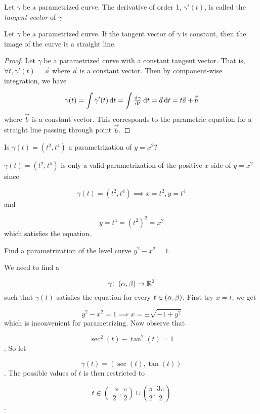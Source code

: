 \begin{definition}
		Let \(\gamma\) be a parametrized curve. The derivative of order 1, \(\gamma'(t)\), is called the \textit{tangent vector} of \(\gamma\)

\end{definition}


\begin{theorem}
		Let \(\gamma\) be a parametrized curve. If the tangent vector of \(\gamma\) is constant, then the image of the curve is a straight line.

\begin{proof}
			Let \(\gamma\) be a parametrized curve with a constant tangent vector. That is, \(\forall t, \gamma'(t) = \vec{a}\) where \(\vec{a}\) is a constant vector. Then by component-wise integration, we have

\[
\gamma(t) = \int\gamma'(t) \dif t = \int\od{\gamma}{t} \dif t = \vec{a} \dif t = t\vec{a} + \vec{b}
\]
			where \(\vec{b}\) is a constant vector. This corresponds to the parametric equation for a straight line passing through point \(\vec{b}\).

\end{proof}

\end{theorem}


\begin{problem}
		Is \(\gamma(t) = (t^{2}, t^{4})\) a parametrization of \(y = x^{2}\)?

\end{problem}


\begin{solution}
		\(\gamma(t) = (t^{2}, t^{4})\) is only a valid parametrization of the positive \(x\) side of \(y = x^{2}\) since

\[
\gamma(t) = (t^{2}, t^{4}) \implies x = t^{2}, y = t^{4}
\]
		and

\[
y = t^{4} = (t^{2})^{2} = x^{2}
\]
		which satisfies the equation.

\end{solution}


\begin{problem}
		Find a parametrization of the level curve \(y^{2} - x^{2} = 1\).

\end{problem}


\begin{solution}
		We need to find a

\[
\gamma \colon \intoo{\alpha,\beta} \rightarrow \mathbb{R}^{2}
\]
		such that \(\gamma(t)\) satisfies the equation for every \(t \in \intoo{\alpha, \beta}\). First try \(x = t\), we get

\[
y^{2} - x^{2} = 1 \implies x = \pm\sqrt{-1 + y^{2}}
\]
		which is inconvenient for parametrizing. Now observe that

\[
\sec^{2}(t) - \tan^{2}(t) = 1
\]
. So let

\[
\gamma(t) = (\sec(t), \tan(t))
\]
. The possible values of \(t\) is then restricted to

\[
t \in (\frac{-\pi}{2}, \frac{\pi}{2}) \cup (\frac{\pi}{2}, \frac{3\pi}{2})
\]
.

\end{solution}



